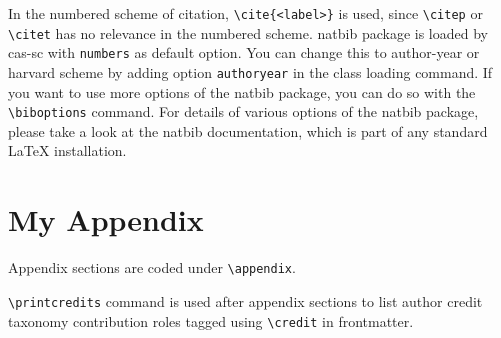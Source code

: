 \documentclass[a4paper,fleqn]{cas-sc}
\begin{document}
In the numbered scheme of citation, \verb+\cite{<label>}+ is used,
since \verb+\citep+ or \verb+\citet+ has no relevance in the numbered
scheme.  {natbib} package is loaded by {cas-sc} with
\verb+numbers+ as default option.  You can change this to author-year
or harvard scheme by adding option \verb+authoryear+ in the class
loading command.  If you want to use more options of the {natbib}
package, you can do so with the \verb+\biboptions+ command.  For
details of various options of the {natbib} package, please take a
look at the {natbib} documentation, which is part of any standard
\LaTeX{} installation.

\appendix
\section{My Appendix}
Appendix sections are coded under \verb+\appendix+.

\verb+\printcredits+ command is used after appendix sections to list 
author credit taxonomy contribution roles tagged using \verb+\credit+ 
in frontmatter.

\printcredits
\end{document}
